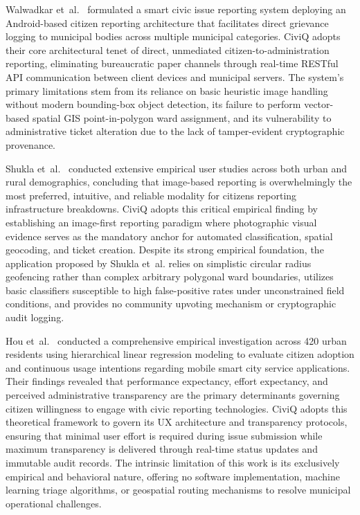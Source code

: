 \documentclass[12pt,a4paper]{report}
\begin{document}
Walwadkar et~al.~\cite{ref_walwadkar2022_smartcivic} formulated a smart civic issue reporting system deploying an Android-based citizen reporting architecture that facilitates direct grievance logging to municipal bodies across multiple municipal categories. CiviQ adopts their core architectural tenet of direct, unmediated citizen-to-administration reporting, eliminating bureaucratic paper channels through real-time RESTful API communication between client devices and municipal servers. The system's primary limitations stem from its reliance on basic heuristic image handling without modern bounding-box object detection, its failure to perform vector-based spatial GIS point-in-polygon ward assignment, and its vulnerability to administrative ticket alteration due to the lack of tamper-evident cryptographic provenance.

Shukla et~al.~\cite{ref_shukla2024_jetir} conducted extensive empirical user studies across both urban and rural demographics, concluding that image-based reporting is overwhelmingly the most preferred, intuitive, and reliable modality for citizens reporting infrastructure breakdowns. CiviQ adopts this critical empirical finding by establishing an image-first reporting paradigm where photographic visual evidence serves as the mandatory anchor for automated classification, spatial geocoding, and ticket creation. Despite its strong empirical foundation, the application proposed by Shukla et~al. relies on simplistic circular radius geofencing rather than complex arbitrary polygonal ward boundaries, utilizes basic classifiers susceptible to high false-positive rates under unconstrained field conditions, and provides no community upvoting mechanism or cryptographic audit logging.

Hou et~al.~\cite{ref_hou2020_smartcities} conducted a comprehensive empirical investigation across 420 urban residents using hierarchical linear regression modeling to evaluate citizen adoption and continuous usage intentions regarding mobile smart city service applications. Their findings revealed that performance expectancy, effort expectancy, and perceived administrative transparency are the primary determinants governing citizen willingness to engage with civic reporting technologies. CiviQ adopts this theoretical framework to govern its UX architecture and transparency protocols, ensuring that minimal user effort is required during issue submission while maximum transparency is delivered through real-time status updates and immutable audit records. The intrinsic limitation of this work is its exclusively empirical and behavioral nature, offering no software implementation, machine learning triage algorithms, or geospatial routing mechanisms to resolve municipal operational challenges.
\end{document}

